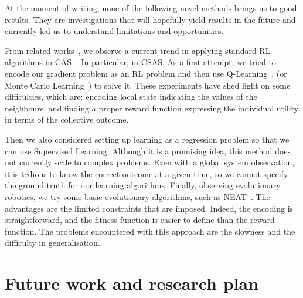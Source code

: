 \documentclass[conference]{IEEEtran}
\begin{document}
At the moment of writing, none of the following novel methods brings us to good results. They are investigations that will hopefully yield results in the future and currently led us to understand limitations and opportunities.

From related works~\cite{DAngelo2019}, we observe a current trend in applying standard RL algorithms in CAS -- In particular, in CSAS.
%
As a first attempt, we tried to encode our gradient problem as an RL problem and then use Q-Learning~\cite{DBLP:journals/ras/Krose95}, (or Monte Carlo Learning~\cite{DBLP:conf/nips/Thrun99}) to solve it.
%
These experiments have shed light on some difficulties, which are: encoding local state indicating the values of the neighbours, and finding a proper reward function expressing the individual utility in terms of the collective outcome. %

Then we also considered setting up learning as a regression problem so that we can use Supervised Learning.
% 
Although it is a promising idea, this method does not currently scale to complex problems.
%
Even with a global system observation, it is tedious to know the correct outcome at a given time, so we cannot specify the ground truth for our learning algorithms.
%
Finally, observing evolutionary robotics, we try some basic evolutionary algorithms, such as NEAT~\cite{DBLP:journals/ec/StanleyM02}.
%
The advantages are the limited constraints that are imposed. Indeed, the encoding is straightforward, and the fitness function is easier to define than the reward function.
%
The problems encountered with this approach are the slowness and the difficulty in generalisation.
%
\section{Future work and research plan}
%
%
%

%
%
\end{document}
